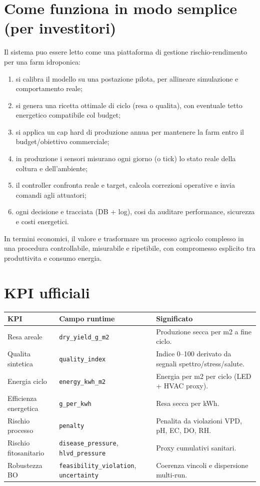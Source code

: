 ﻿\documentclass[11pt,a4paper]{report}
\begin{document}
\section{Come funziona in modo semplice (per investitori)}
Il sistema puo essere letto come una piattaforma di gestione rischio-rendimento per una farm idroponica:
\begin{enumerate}
  \item si calibra il modello su una postazione pilota, per allineare simulazione e comportamento reale;
  \item si genera una ricetta ottimale di ciclo (resa o qualita), con eventuale tetto energetico compatibile col budget;
  \item si applica un cap hard di produzione annua per mantenere la farm entro il budget/obiettivo commerciale;
  \item in produzione i sensori misurano ogni giorno (o tick) lo stato reale della coltura e dell'ambiente;
  \item il controller confronta reale e target, calcola correzioni operative e invia comandi agli attuatori;
  \item ogni decisione e tracciata (DB + log), cosi da auditare performance, sicurezza e costi energetici.
\end{enumerate}
In termini economici, il valore e trasformare un processo agricolo complesso in una procedura controllabile,
misurabile e ripetibile, con compromesso esplicito tra produttivita e consumo energia.

\section{KPI ufficiali}
\begin{longtable}{@{}p{4.0cm}p{4.0cm}p{5.8cm}@{}}
\toprule
KPI & Campo runtime & Significato \\ \midrule
Resa areale & \texttt{dry\_yield\_g\_m2} & Produzione secca per m2 a fine ciclo. \\
Qualita sintetica & \texttt{quality\_index} & Indice 0--100 derivato da segnali spettro/stress/salute. \\
Energia ciclo & \texttt{energy\_kwh\_m2} & Energia per m2 per ciclo (LED + HVAC proxy). \\
Efficienza energetica & \texttt{g\_per\_kwh} & Resa secca per kWh. \\
Rischio processo & \texttt{penalty} & Penalita da violazioni VPD, pH, EC, DO, RH. \\
Rischio fitosanitario & \texttt{disease\_pressure}, \texttt{hlvd\_pressure} & Proxy cumulativi sanitari. \\
Robustezza BO & \texttt{feasibility\_violation}, \texttt{uncertainty} & Coerenza vincoli e dispersione multi-run. \\
\bottomrule
\end{longtable}
\end{document}
